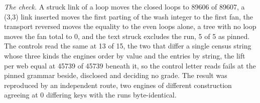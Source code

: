 \begin{chproof}[census]
\textit{The check.} A struck link of a loop moves the closed loops to 89606 of 89607, a (3,3) link inserted moves the first parting of the wash integer to the first fan, the transport reversed moves the equality to the even loops alone, a tree with no loop moves the fan total to 0, and the text struck excludes the run, 5 of 5 as pinned. The controls read the same at 13 of 15, the two that differ a single census string whose three kinds the engines order by value and the entries by string, the lift per web equal at 45739 of 45739 beneath it, so the control letter reads fails at the pinned grammar beside, disclosed and deciding no grade. The result was reproduced by an independent route, two engines of different construction agreeing at 0 differing keys with the runs byte-identical.
\end{chproof}
\par\medskip{}\label{narr:close:13-6}\par
